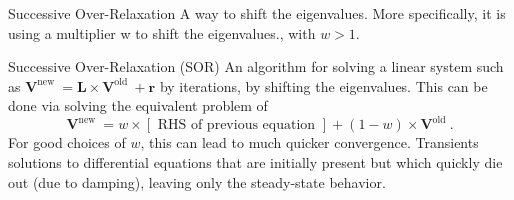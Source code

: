 \documentclass{book}
\theoremstyle{plain}
\theoremstyle{definition}
\numberwithin{exm}{chapter}
\theoremstyle{remark}
\theoremstyle{summary}
\theoremstyle{overview}
\begin{document}
Successive Over-Relaxation A way to shift the eigenvalues. More specifically, it is using a multiplier w to shift the eigenvalues., with $w>1$.

Successive Over-Relaxation (SOR) An algorithm for solving a linear system such as $\mathbf{V}^{\text {new }}=\mathbf{L} \times \mathbf{V}^{\text {old }}+\mathbf{r}$ by iterations, by shifting the eigenvalues. This can be done via solving the equivalent problem of
$$
\mathbf{V}^{\text {new }}=w \times[\text { RHS of previous equation }]+(1-w) \times \mathbf{V}^{\text {old }} .
$$
For good choices of $w$, this can lead to much quicker convergence.
Transients solutions to differential equations that are initially present but which quickly die out (due to damping), leaving only the steady-state behavior.
\end{document}
